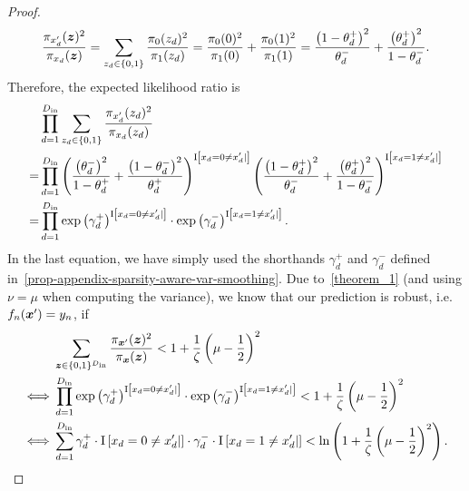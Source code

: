 \begin{proof}
\begin{equation}
     \frac{\pi_{{x}'_d}({\bm{z}})^2}{\pi_{{x}_d}({\bm{z}})} 
     =
     \sum_{{z}_d \in \{0,1\}}
     \frac{\pi_{0}({z}_d)^2}{\pi_{1}({z}_d)} 
     =
     \frac{\pi_{0}(0)^2}{\pi_{1}(0)} 
     +
     \frac{\pi_{0}(1)^2}{\pi_{1}(1)} 
     = 
     \frac{\left(1 - {\theta}^{+}_d\right)^2}{{\theta}^{-}_d}
+ \frac{\left({\theta}^{+}_d\right)^2}{1 - {\theta}^{-}_d}.
\end{equation}
Therefore, the expected likelihood ratio is 
\begin{align}
    &\prod_{d=1}^{D_\mathrm{in}}
    \sum_{{z}_d \in \{0,1\}}
     \frac{\pi_{{x}'_d}({z}_d)^2}{\pi_{{x}_d}({z}_d)}
     \\
     = 
     &\prod_{d=1}^{D_\mathrm{in}}
     \left(
     \frac{\left({\theta}^{-}_d\right)^2}{1 - {\theta}^{+}_d}
     +
     \frac{\left(1 - {\theta}^{-}_d\right)^2}{{\theta}^{+}_d}
     \right)^{\mathrm{I}\left[{x}_d = 0 \neq {x}'_d| \right]}
     \left(
     \frac{\left(1 - {\theta}^{+}_d\right)^2}{{\theta}^{-}_d}
    + \frac{\left({\theta}^{+}_d\right)^2}{1 - {\theta}^{-}_d}
     \right)^{\mathrm{I}\left[{x}_d = 1 \neq {x}'_d| \right]}
     \\
     =
     &\prod_{d=1}^{D_\mathrm{in}}
     \exp\left(\gamma_{d}^{+}\right)^{\mathrm{I}\left[{x}_d = 0 \neq {x}'_d| \right]}
     \cdot
     \exp\left(\gamma_{d}^{-}\right)^{\mathrm{I}\left[{x}_d = 1 \neq {x}'_d| \right]}
     .
\end{align}
In the last equation, we have simply used the shorthands $\gamma_d^{+}$ and $\gamma_d^{-}$ defined in~\cref{prop-appendix-sparsity-aware-var-smoothing}.
Due to~\autoref{theorem_1} (and using $\nu = \mu$ when computing the variance), we know that our prediction is robust, i.e.~$f_n({\bm{x}}') = {y}_n$, if 
\begin{align}
    &\sum_{{\bm{z}} \in \{0,1\}^{D_\mathrm{in}}} \frac{\pi_{{\bm{x}}'}({\bm{z}})^2}{\pi_{{\bm{x}}}({\bm{z}})}
    <
     1 + \frac{1}{\zeta}\left(\mu - \frac{1}{2}\right)^2
     \\
    \iff
    &
    \prod_{d=1}^{D_\mathrm{in}}
     \exp\left(\gamma_{d}^{+}\right)^{\mathrm{I}\left[{x}_d = 0 \neq {x}'_d| \right]}
     \cdot
     \exp\left(\gamma_{d}^{-}\right)^{\mathrm{I}\left[{x}_d = 1 \neq {x}'_d| \right]}
     <
     1 + \frac{1}{\zeta}\left(\mu - \frac{1}{2}\right)^2
     \\
     \iff
     &
     \sum_{d=1}^{D_\mathrm{in}}
     \gamma_{d}^{+} \cdot {\mathrm{I}\left[{x}_d = 0 \neq {x}'_d| \right]}
     \cdot
     \gamma_{d}^{-} \cdot {\mathrm{I}\left[{x}_d = 1 \neq {x}'_d| \right]}
     < \ln\left(1 + \frac{1}{\zeta}\left(\mu - \frac{1}{2}\right)^2\right).
\end{align}
\end{proof}

